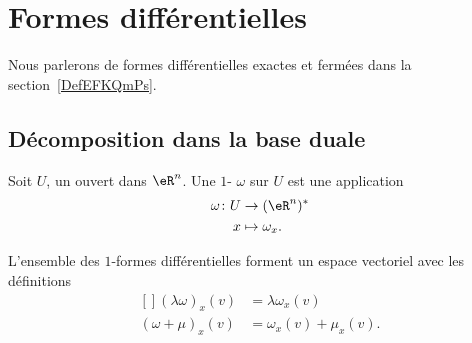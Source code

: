 
\section{Formes différentielles}
\label{SecFormDiffRappel}

Nous parlerons de formes différentielles exactes et fermées dans la section~\ref{DefEFKQmPs}.

\subsection{Décomposition dans la base duale}

\begin{definition}      \label{DEFooMGXSooWioKie}
	Soit $U$, un ouvert dans $\eR^n$. Une $1$- $\omega$ sur $U$ est une application
	\begin{equation}
		\begin{aligned}
				\omega\colon U&\to (\eR^n)^* \\
				x&\mapsto \omega_x.
			\end{aligned}
		\end{equation}
\end{definition}

\begin{remark}
	L'ensemble des $1$-formes différentielles forment un espace vectoriel avec les définitions
	\begin{equation}
		\begin{aligned}[]
			(\lambda\omega)_x(v)&=\lambda\omega_x(v)\\
			(\omega+\mu)_x(v)&=\omega_x(v)+\mu_x(v).
		\end{aligned}
	\end{equation}
\end{remark}

